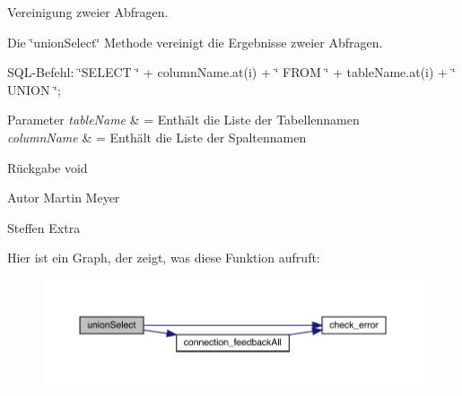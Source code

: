 Vereinigung zweier Abfragen. 

Die \char`\"{}union\+Select\char`\"{} Methode vereinigt die Ergebnisse zweier Abfragen.~\newline


S\+Q\+L-\/\+Befehl\+: \char`\"{}\+S\+E\+L\+E\+C\+T \char`\"{} + column\+Name.\+at(i) + \char`\"{} F\+R\+O\+M \char`\"{} + table\+Name.\+at(i) + \char`\"{} U\+N\+I\+O\+N \char`\"{};


\begin{DoxyParams}{Parameter}
{\em table\+Name} & = Enthält die Liste der Tabellennamen \\
\hline
{\em column\+Name} & = Enthält die Liste der Spaltennamen\\
\hline
\end{DoxyParams}
\begin{DoxyReturn}{Rückgabe}
void
\end{DoxyReturn}
\begin{DoxyAuthor}{Autor}
Martin Meyer 

Steffen Extra 
\end{DoxyAuthor}
Hier ist ein Graph, der zeigt, was diese Funktion aufruft\+:\nopagebreak
\begin{figure}[H]
\begin{center}
\leavevmode
\includegraphics[width=350pt]{selection_request_8cpp_a1bde570da9c90a3d0f6e94bc1b06c5e3_cgraph}
\end{center}
\end{figure}
